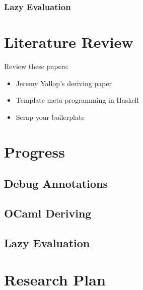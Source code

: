 \documentclass[12pt,fullpage]{article}
\begin{document}
\subsubsection{Lazy Evaluation}
\section{Literature Review}

Review these papers:

\begin{itemize}
\item Jeremy Yallop's deriving paper \cite{yallop07}
\item Template meta-programming in Haskell \cite{sheard02}
\item Scrap your boilerplate \cite{lammel03}
\end{itemize}
\section{Progress}
\subsection{Debug Annotations}

\subsection{OCaml Deriving}
\subsection{Lazy Evaluation}
\section{Research Plan}
\printbibliography
\end{document}

